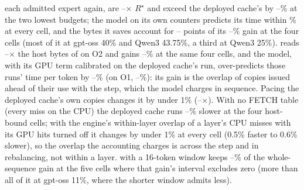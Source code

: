 each admitted expert again, are \fsbTotalReadsOptMin--\fsbTotalReadsOptMax$\times$ $R^\star$ and exceed the deployed
cache's by \fsbLowReadsVsBaseMin--\fsbLowReadsVsBaseMax\% at the two lowest budgets; the model on its own counters
predicts its time within \fsbLawErrMax\% at every cell, and the bytes it saves account for
\fsbLawGainHighMin--\fsbLawGainHighMax{} points of its \fsbGainHighMin--\fsbGainHighMax\% gain at the four cells
(most of it at gpt-oss 40\% and Qwen3 43.75\%, a third at Qwen3 25\%).  reads
\fspVsBypassBytesMin--\fspVsBypassBytesMax$\times$ the host bytes of \MinTwo{} on O2 and gains
\fspGainHighMin--\fspGainHighMax\% at the same four cells, and the model, with its GPU term calibrated on the deployed cache's run,
over-predicts those runs' time per token by \fspLawErrHighMin--\fspLawErrHighMax\% (on O1, \fsmLawErrPosMin--\fsmLawErrPosMax\%): its gain
is the overlap of copies issued ahead of their use with the step, which the model charges in sequence. Pacing the
deployed cache's own copies changes it by under 1\% (\fsmPacedMin--\fsmPacedMax$\times$). With no FETCH table (every
miss on the CPU) the deployed cache runs \fsmAllcpuMin--\fsmAllcpuMax\% slower at the four host-bound cells; with the
engine's within-layer overlap of a layer's CPU misses with its GPU hits turned off it changes by under 1\% at every
cell (0.5\% faster to 0.6\% slower), so the overlap the accounting charges is across the step and in rebalancing, not
within a layer. \MinTwo{} with a 16-token window keeps \fsbSixteenShareMin--\fsbSixteenShareMax\% of
the whole-sequence gain at the five cells where that gain's interval excludes zero (more than all of it at gpt-oss
11\%, where the shorter window admits less).

